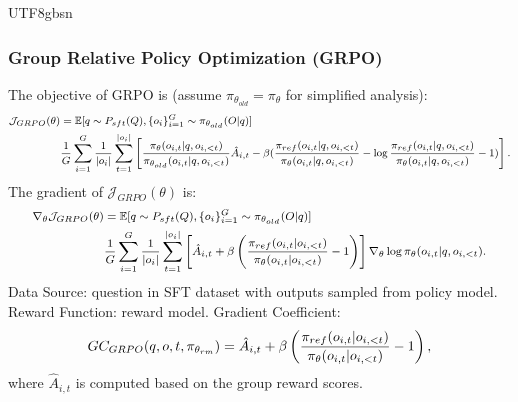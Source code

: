 \documentclass[11pt, a4paper, logo, copyright, nonumbering]{deepseek}
\begin{document}
\begin{CJK*}{UTF8}{gbsn}
\subsubsection{Group Relative Policy Optimization (GRPO)}
The objective of GRPO is (assume $\pi_{\theta_{old}} = \pi_{\theta}$ for simplified analysis):
\begin{equation}
\footnotesize
\begin{split}
    \mathcal{J}_{GRPO}(\theta) &= \mathbb{E}{[q \sim P_{sft}(Q), \{o_i\}_{i=1}^G \sim \pi_{\theta_{old}}(O|q)]}  \\
    & \frac{1}{G}\sum_{i=1}^G\frac{1}{|o_i|} \sum_{t=1}^{|o_i|} \left[\frac{\pi_\theta(o_{i,t} | q, o_{i,<t})}{\pi_{\theta_{old}}(o_{i,t} | q, o_{i,<t})} \hat{A}_{i,t} - \beta (\frac{\pi_{ref}(o_{i,t}|q,o_{i,<t})}{\pi_{\theta}(o_{i,t}|q,o_{i,<t})}- \log\frac{\pi_{ref}(o_{i,t}|q,o_{i,<t})}{\pi_{\theta}(o_{i,t}|q,o_{i,<t})} - 1)\right].
\end{split}
\end{equation}
The gradient of $\mathcal{J}_{GRPO}(\theta)$ is:
\begin{equation}
\footnotesize
\begin{split}
    \nabla_{\theta}\mathcal{J}_{GRPO}(\theta)  & = \mathbb{E}{[q \sim P_{sft}(Q), \{o_i\}_{i=1}^G \sim \pi_{\theta_{old}}(O|q)]} \\
    & \frac{1}{G}\sum_{i=1}^G\frac{1}{|o_i|} \sum_{t=1}^{|o_i|}  
    \left[\hat{A}_{i,t} + \beta \left(\frac{\pi_{ref}(o_{i,t}|o_{i,<t})}{\pi_{\theta}(o_{i,t}|o_{i,<t})} - 1\right)\right]  \nabla_{\theta}\log \pi_\theta(o_{i,t} | q, o_{i,<t}). 
\end{split}
\end{equation}
Data Source:  question in SFT dataset with outputs sampled from policy model.
Reward Function: reward model.
Gradient Coefficient:
\begin{equation}
\footnotesize
    GC_{GRPO}(q, o, t, \pi_{\theta_{rm}}) = \hat{A}_{i,t} + \beta \left(\frac{\pi_{ref}(o_{i,t}|o_{i,<t})}{\pi_{\theta}(o_{i,t}|o_{i,<t})} - 1\right),
\label{eq:GC-GRPO}
\end{equation}
where $\hat{A}_{i,t}$ is computed based on the group reward scores.




\end{CJK*}
\end{document}
